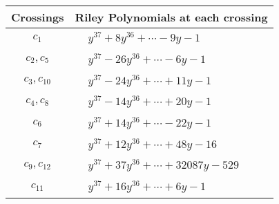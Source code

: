 \documentclass[1p]{elsarticle_modified}
\theoremstyle{definition}
\begin{document}
\begin{tabular}{m{50pt}|m{274pt}}
Crossings & \hspace{64pt}Riley Polynomials at each crossing \\
\hline $$\begin{aligned}c_{1}\end{aligned}$$&$\begin{aligned}
&y^{37}+8 y^{36}+\cdots-9 y-1
\end{aligned}$\\
\hline $$\begin{aligned}c_{2},c_{5}\end{aligned}$$&$\begin{aligned}
&y^{37}-26 y^{36}+\cdots-6 y-1
\end{aligned}$\\
\hline $$\begin{aligned}c_{3},c_{10}\end{aligned}$$&$\begin{aligned}
&y^{37}-24 y^{36}+\cdots+11 y-1
\end{aligned}$\\
\hline $$\begin{aligned}c_{4},c_{8}\end{aligned}$$&$\begin{aligned}
&y^{37}-14 y^{36}+\cdots+20 y-1
\end{aligned}$\\
\hline $$\begin{aligned}c_{6}\end{aligned}$$&$\begin{aligned}
&y^{37}+14 y^{36}+\cdots-22 y-1
\end{aligned}$\\
\hline $$\begin{aligned}c_{7}\end{aligned}$$&$\begin{aligned}
&y^{37}+12 y^{36}+\cdots+48 y-16
\end{aligned}$\\
\hline $$\begin{aligned}c_{9},c_{12}\end{aligned}$$&$\begin{aligned}
&y^{37}+37 y^{36}+\cdots+32087 y-529
\end{aligned}$\\
\hline $$\begin{aligned}c_{11}\end{aligned}$$&$\begin{aligned}
&y^{37}+16 y^{36}+\cdots+6 y-1
\end{aligned}$\\
\hline
\end{tabular}\\~\\
\end{document}
